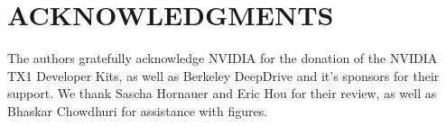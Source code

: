\section*{ACKNOWLEDGMENTS}
The authors gratefully acknowledge NVIDIA for the donation of the NVIDIA TX1 Developer Kits, as well as Berkeley DeepDrive and it's sponsors for their support. We thank Sascha Hornauer and Eric Hou for their review, as well as Bhaskar Chowdhuri for assistance with figures.
